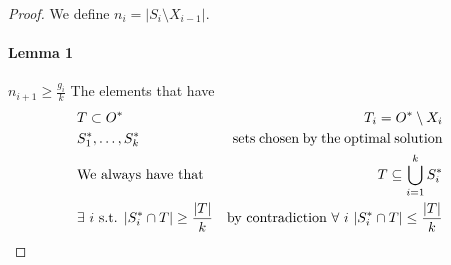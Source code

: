\documentclass[]{article}
\begin{document}
\begin{proof}
	We define $n_i = |S_i \setminus X_{i-1}|$.
	\paragraph{Lemma 1} $n_{i+1} \geq \frac{g_i}{k}$ The elements that have 
	\begin{align*}
	&T \subset O^* &T_i = O^* \setminus X_i\\
	&S_1^*, \dots ,S_k^*&\parbox{15em}{sets chosen by the optimal solution}\\
	&\text{We always have that }&T\subseteq \bigcup_{i=1}^{k}S_i^*\\
	&\exists\ i\ \text{s.t. }|S_i^* \cap T| \geq \frac{|T|}{k}& \text{by contradiction } \forall\ i\ |S_i^* \cap T| \leq \frac{|T|}{k}\\
	\end{align*}
\end{proof}
\end{document}
